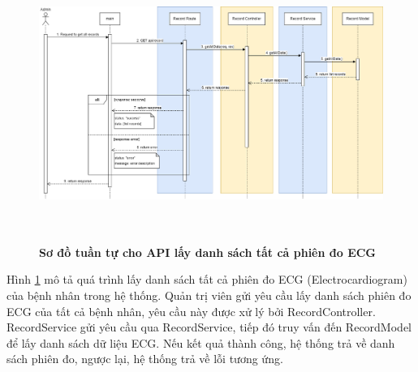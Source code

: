 \begin{figure}[H]
  \centering
  \includegraphics[width=16cm,height=9cm]{Images/sequence_api/getAllRecord.png}
  \caption[Sơ đồ tuần tự cho API lấy danh sách tất cả phiên đo ECG ]{\bfseries \fontsize{12pt}{0pt}
  \selectfont Sơ đồ tuần tự cho API lấy danh sách tất cả phiên đo ECG }
  \label{api_getAllEcgRecords} %
\end{figure}
Hình \ref{api_getAllEcgRecords} mô tả quá trình lấy danh sách tất cả phiên đo ECG (Electrocardiogram) của bệnh nhân trong hệ thống. Quản trị viên gửi yêu cầu lấy danh sách phiên đo ECG của tất cả bệnh nhân, 
yêu cầu này được xử lý bởi RecordController. RecordService gửi yêu cầu qua RecordService, tiếp đó truy vấn đến RecordModel để lấy danh sách dữ liệu ECG. Nếu kết quả thành công, hệ thống trả về danh sách phiên đo, 
ngược lại, hệ thống trả về lỗi tương ứng.

